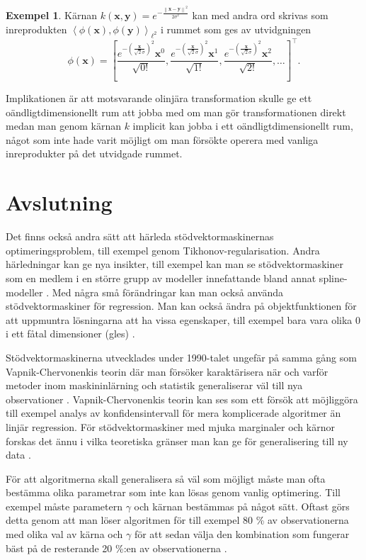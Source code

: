 \documentclass[a4paper, 12pt]{report}
\theoremstyle{definition}
\newtheorem{ex}{Exempel}[section]
\theoremstyle{remark}
\newcommand{\bfx}{\mathbf{x}}
\newcommand{\bfy}{\mathbf{y}}
\newcommand{\llangle}{\left\langle}
\newcommand{\rrangle}{\right\rangle}
\newcommand{\inner}[2]{\llangle #1, #2 \rrangle}
\begin{document}
\begin{ex}
	Kärnan $k\left(\bfx, \bfy\right)=e^{-\frac{\left\| \bfx-\bfy\right\|^2}{2\sigma^2}}$ kan med andra ord skrivas som inreprodukten $\inner{\phi\left(\bfx\right)}{\phi\left(\bfy\right)}_{\ell^2}$ i rummet som ges av utvidgningen
	\begin{equation*}
	\phi\left(\bfx\right)=\left[\frac{e^{-\left(\frac{\bfx}{\sqrt{2}\sigma}\right)^2} \bfx^0}{\sqrt{0!}}, \frac{e^{-\left(\frac{\bfx}{\sqrt{2}\sigma}\right)^2} \bfx^1}{\sqrt{1!}}, \frac{e^{-\left(\frac{\bfx}{\sqrt{2}\sigma}\right)^2} \bfx^2}{\sqrt{2!}}, \dots\right]^\intercal.
	\end{equation*}
	
	Implikationen är att motsvarande olinjära transformation skulle ge ett oändligtdimensionellt rum att jobba med om man gör transformationen direkt medan man genom kärnan $k$ implicit kan jobba i ett oändligtdimensionellt rum, något som inte hade varit möjligt om man försökte operera med vanliga inreprodukter på det utvidgade rummet.
\end{ex}



\chapter{Avslutning}
Det finns också andra sätt att härleda stödvektormaskinernas optimeringsproblem, till exempel genom Tikhonov-regularisation. Andra härledningar kan ge nya insikter, till exempel kan man se stödvektormaskiner som en medlem i en större grupp av modeller innefattande bland annat spline-modeller \cite{ESL}. Med några små förändringar kan man också använda stödvektormaskiner för regression. Man kan också ändra på objektfunktionen för att uppmuntra lösningarna att ha vissa egenskaper, till exempel bara vara olika 0 i ett fåtal dimensioner (gles) \cite{LearningKernels}.

Stödvektormaskinerna utvecklades under 1990-talet ungefär på samma gång som Vapnik-Chervonenkis teorin där man försöker karaktärisera när och varför metoder inom maskininlärning och statistik generaliserar väl till nya observationer \cite{VC}. Vapnik-Chervonenkis teorin kan ses som ett försök att möjliggöra till exempel analys av konfidensintervall för mera komplicerade algoritmer än linjär regression. För stödvektormaskiner med mjuka marginaler och kärnor forskas det ännu i vilka teoretiska gränser man kan ge för generalisering till ny data \cite{theoretical}.

För att algoritmerna skall generalisera så väl som möjligt måste man ofta bestämma olika parametrar som inte kan lösas genom vanlig optimering. Till exempel måste parametern $\gamma$ och kärnan bestämmas på något sätt. Oftast görs detta genom att man löser algoritmen för till exempel 80 \% av observationerna med olika val av kärna och $\gamma$ för att sedan välja den kombination som fungerar bäst på de resterande 20 \%:en av observationerna \cite{ESL}.
\end{document}
